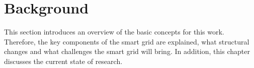\chapter{Background}
\label{sec:state}







This section introduces an overview of the basic concepts for this work. Therefore, the key components of the smart grid are explained, what structural changes and what challenges the smart grid will bring.
In addition, this chapter discusses the current state of research.\\

